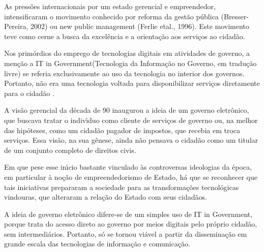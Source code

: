 \documentclass[
12pt,		%
openright,	%
twoside,  %
a4paper,			%
chapter=TITLE,		%
english,			%
french,				%
spanish,			%
brazil				%
]{USPSC-classe/USPSC}
\begin{document}
As press\~oes internacionais por um estado gerencial e empreendedor, intensificaram o movimento conhecido por reforma da gest\~ao p\'ublica (Bresser-Pereira, 2002) ou new public management (Ferlie etal., 1996). Este movimento teve como cerne a busca da excel\^encia e a orienta\c{c}\~ao aos servi\c{c}os ao cidad\~ao.









Nos prim\'ordios do emprego de tecnologias digitais em atividades de governo, a men\c{c}\~ao a \textquotedbl IT in Government\textquotedbl  (Tecnologia da Informa\c{c}\~ao no Governo, em tradu\c{c}\~ao livre) se referia exclusivamente ao uso da tecnologia no interior dos governos. Portanto, n\~ao era uma tecnologia voltada para disponibilizar servi\c{c}os diretamente para o cidad\~ao .









A vis\~ao gerencial da d\'ecada de 90 inaugurou a ideia de um \textquotedbl governo eletr\^onico\textquotedbl , que buscava tratar o indiv\'{\i}duo como \textquotedbl  cliente \textquotedbl  de servi\c{c}os de governo ou, na melhor das hip\'oteses, como um cidad\~ao \textquotedbl pagador de impostos\textquotedbl , que recebia em troca servi\c{c}os. Essa vis\~ao, na sua g\^enese, ainda n\~ao pensava o cidad\~ao como um titular de um conjunto completo de direitos civis.









Em que pese esse in\'{\i}cio bastante vinculado \`as controversas ideologias da \'epoca, em particular \`a no\c{c}\~ao de \textquotedbl empreendedorismo de Estado\textquotedbl , h\'a que se reconhecer que tais iniciativas prepararam a sociedade para as transforma\c{c}\~oes tecnol\'ogicas vindouras, que alteraram a rela\c{c}\~ao do Estado com seus cidad\~aos.









A ideia de governo eletr\^onico difere-se de um simples uso de \textquotedbl IT in Government\textquotedbl , porque trata do acesso direto ao governo por meios digitais pelo pr\'oprio cidad\~ao, sem intermedi\'arios. Portanto, s\'o se tornou vi\'avel a partir da dissemina\c{c}\~ao em grande escala das tecnologias de informa\c{c}\~ao e comunica\c{c}\~ao.
\end{document}
